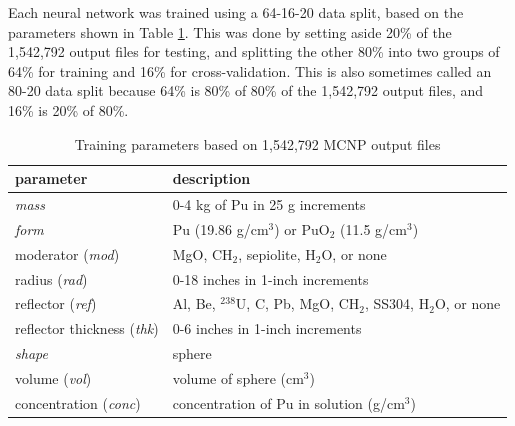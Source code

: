 Each neural network was trained using a 64-16-20 data split, based on the parameters shown in Table \ref{table:output1}.
This was done by setting aside 20\% of the 1,542,792 output files for testing, and splitting the other 80\% into two groups of 64\% for training and 16\% for cross-validation.
This is also sometimes called an 80-20 data split because 64\% is 80\% of 80\% of the 1,542,792 output files, and 16\% is 20\% of 80\%.
%
\begin{table}
  \caption{Training parameters based on 1,542,792 MCNP output files}
  \label{table:output1}
  \renewcommand\arraystretch{1.5}
  \begin{center}
    \begin{tabular}{|l l|}
      \hline
      parameter                          & description \\
      \hline
      \textit{mass}                      & 0-4 kg of Pu in 25 g increments \\
      \textit{form}                      & Pu (19.86 g/cm$^{3}$) or PuO$_{2}$ (11.5 g/cm$^{3}$) \\
      moderator (\textit{mod})           & MgO, CH$_{2}$, sepiolite, H$_{2}$O, or none \\
      radius (\textit{rad})              & 0-18 inches in 1-inch increments \\
      reflector (\textit{ref})           & Al, Be, $^{238}$U, C, Pb, MgO, CH$_{2}$, SS304, H$_{2}$O, or none \\
      reflector thickness (\textit{thk}) & 0-6 inches in 1-inch increments \\
      \textit{shape}                     & sphere \\
      volume (\textit{vol})              & volume of sphere (cm$^{3}$) \\
      concentration (\textit{conc})      & concentration of Pu in solution (g/cm$^{3}$) \\
      \hline
    \end{tabular}
  \end{center}
\end{table}

